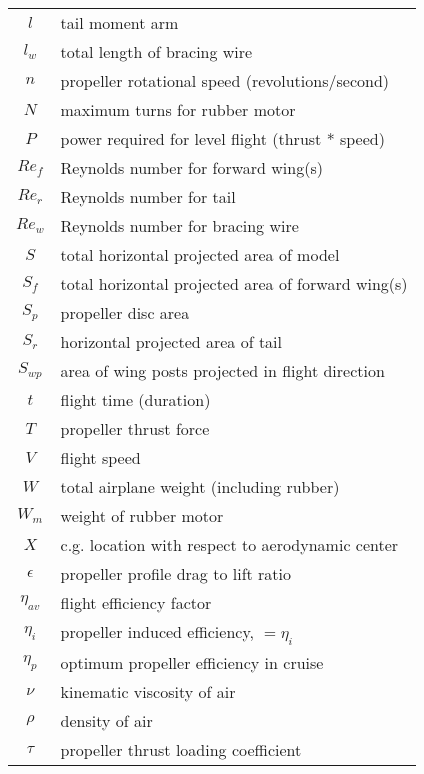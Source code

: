 \begin{center}
\begin{tabular}{ |c|l| }
	$l$ & tail moment arm \\
	$l_w$ & total length of bracing wire \\
 	$n$ & propeller rotational speed (revolutions/second) \\
	$N$ & maximum turns for rubber motor \\
	$P$ & power required for level flight (thrust * speed) \\
	$Re_f$&  Reynolds number for forward wing(s) \\
	$Re_r$ & Reynolds number for tail \\
	$Re_w$ & Reynolds number for bracing wire \\
    $S$ & total horizontal projected area of model \\
    $S_f$ & total horizontal projected area of forward wing(s) \\
    $S_p$ & propeller disc area \\
    $S_r$ & horizontal projected area of tail \\
    $S_{wp}$ & area of wing posts projected in flight direction \\
    $t$ & flight time (duration) \\
    $T$ & propeller thrust force \\
    $V$ & flight speed \\
    $W$ & total airplane weight (including rubber) \\
    $W_m$ & weight of rubber motor \\
    $X$ & c.g. location with respect to aerodynamic center \\
    $\epsilon$ & propeller profile drag to lift ratio \\
    $\eta_{av}$ & flight efficiency factor \\
    $\eta_i$ & propeller induced efficiency, $= \eta_i$ \\
    $\eta_p$ & optimum propeller efficiency in cruise \\
    $\nu$ & kinematic viscosity of air \\
    $\rho$ & density of air \\
    $\tau$ & propeller thrust loading coefficient \\
\end{tabular}
\end{center}
